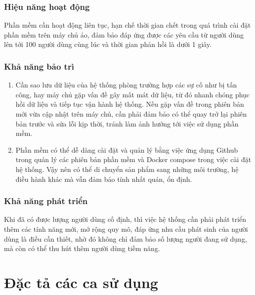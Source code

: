 \documentclass[./../main.tex]{subfiles}
\begin{document}
\subsubsection{Hiệu năng hoạt động}
Phần mềm cần hoạt động liên tục, hạn chế thời gian chết trong quá trình cài đặt phần mềm trên máy chủ ảo, đảm bảo đáp ứng được các yêu cầu từ người dùng lên tới 100 người dùng cùng lúc và thời gian phản hồi là dưới 1 giây.

\subsubsection{Khả năng bảo trì}
\begin{enumerate}
    \item Cần sao lưu dữ liệu của hệ thống phòng trường hợp các sự cố như bị tấn công, hay máy chủ gặp vấn đề gây mất mát dữ liệu, từ đó nhanh chóng phục hồi dữ liệu và tiếp tục vận hành hệ thống. Nếu gặp vấn đề trong phiên bản mới vừa cập nhật trên máy chủ, cần phải đảm bảo có thể quay trở lại phiên bản trước và sửa lỗi kịp thời, tránh làm ảnh hưởng tới việc sử dụng phần mềm.
    \item Phần mềm có thể dễ dàng cài đặt và quản lý bằng việc ứng dụng Github trong quản lý các phiên bản phần mềm và Docker compose trong việc cài đặt hệ thống. Vậy nên có thể di chuyển sản phẩm sang những môi trường, hệ điều hành khác mà vẫn đảm bảo tính nhất quán, ổn định.
\end{enumerate}

\subsubsection{Khả năng phát triển}
Khi đã có được lượng người dùng cố định, thì việc hệ thống cần phải phát triển thêm các tính năng mới, mở rộng quy mô, đáp ứng nhu cầu phát sinh của người dùng là điều cần thiết,  nhờ đó không chỉ đảm bảo số lượng người đang sử dụng, mà còn có thể thu hút thêm người dùng tiềm năng.

\section{Đặc tả các ca sử dụng}
\end{document}
